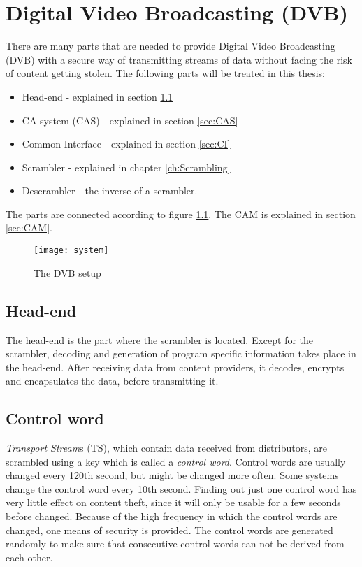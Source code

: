 \chapter{Digital Video Broadcasting (DVB)}
There are many parts that are needed to provide Digital Video 
Broadcasting (DVB) with a secure way of transmitting streams of data 
without facing the risk of content getting stolen. The following parts 
will be treated in this thesis:

\begin{itemize}
\item Head-end - explained in section \ref{sec:HE}
\item CA system (CAS) - explained in section \ref{sec:CAS}
\item Common Interface - explained in section \ref{sec:CI}
\item Scrambler - explained in chapter \ref{ch:Scrambling}
\item Descrambler - the inverse of a scrambler.
\end{itemize}

The parts are connected according to figure \ref{fig:system}. The CAM is
explained in section \ref{sec:CAM}.

\begin{figure}[h!]
  \texttt{[image: system]}
  \caption{The DVB setup}
  \label{fig:system}
\end{figure}

\section{Head-end} \label{sec:HE}
The head-end is the part where the scrambler is located. Except for the 
scrambler, decoding and generation of program specific information takes
place in the head-end. After receiving data from content providers, it 
decodes, encrypts and encapsulates the data, before transmitting it.

\section{Control word} \label{sec:setup}
\emph{Transport Stream}s (TS), which contain data received from 
distributors, are scrambled using a key which is called a \emph{control 
word}. Control words are usually changed every 120th second, but might 
be changed more often. Some systems change the control word every 10th 
second. Finding out just one control word has very little effect on 
content theft, since it will only be usable for a few seconds before 
changed. Because of the high frequency in which the control words are 
changed, one means of security is provided. The control words are 
generated randomly to make sure that consecutive control words can not 
be derived from each other.

